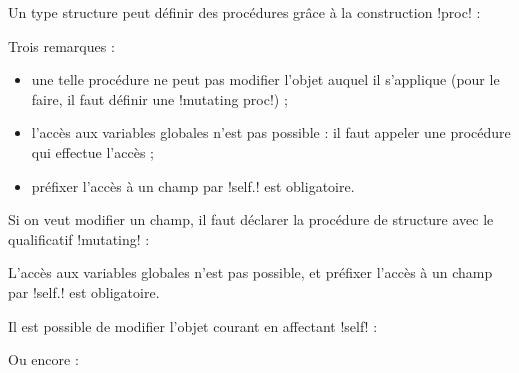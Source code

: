 
Un type structure peut définir des procédures grâce à la construction \plm!proc! :


Trois remarques :
\begin{itemize}
  \item une telle procédure ne peut pas modifier l'objet auquel il s'applique (pour le faire, il faut définir une \plm!mutating proc!) ;
  \item l'accès aux variables globales n'est pas possible : il faut appeler une procédure qui effectue l'accès ;
  \item préfixer l'accès à un champ par \plm!self.! est obligatoire. 
\end{itemize}





Si on veut modifier un champ, il faut déclarer la procédure de structure avec le qualificatif \plm!mutating! :


L'accès aux variables globales n'est pas possible, et préfixer l'accès à un champ par \plm!self.! est obligatoire. 

Il est possible de modifier l'objet courant en affectant \plm!self! :


Ou encore :








